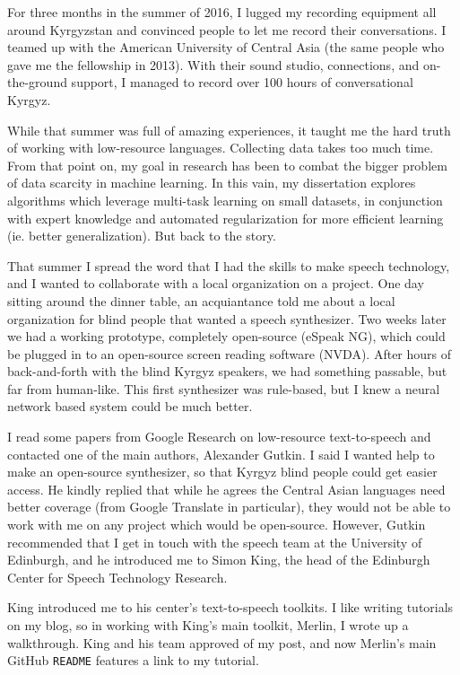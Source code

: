 \documentclass[12pt,a4paper]{article}
\begin{document}
For three months in the summer of 2016, I lugged my recording equipment all around Kyrgyzstan and convinced people to let me record their conversations. I teamed up with the American University of Central Asia (the same people who gave me the fellowship in 2013). With their sound studio, connections, and on-the-ground support, I managed to record over 100 hours of conversational Kyrgyz.

While that summer was full of amazing experiences, it taught me the hard truth of working with low-resource languages. Collecting data takes too much time. From that point on, my goal in research has been to combat the bigger problem of data scarcity in machine learning. In this vain, my dissertation explores algorithms which leverage multi-task learning on small datasets, in conjunction with expert knowledge and automated regularization for more efficient learning (ie. better generalization). But back to the story.

That summer I spread the word that I had the skills to make speech technology, and I wanted to collaborate with a local organization on a project. One day sitting around the dinner table, an acquiantance told me about a local organization for blind people that wanted a speech synthesizer. Two weeks later we had a working prototype, completely open-source (eSpeak NG), which could be plugged in to an open-source screen reading software (NVDA). After hours of back-and-forth with the blind Kyrgyz speakers, we had something passable, but far from human-like. This first synthesizer was rule-based, but I knew a neural network based system could be much better.

I read some papers from Google Research on low-resource text-to-speech and contacted one of the main authors, Alexander Gutkin. I said I wanted help to make an open-source synthesizer, so that Kyrgyz blind people could get easier access. He kindly replied that while he agrees the Central Asian languages need better coverage (from Google Translate in particular), they would not be able to work with me on any project which would be open-source. However, Gutkin recommended that I get in touch with the speech team at the University of Edinburgh, and he introduced me to Simon King, the head of the Edinburgh Center for Speech Technology Research.

King introduced me to his center's text-to-speech toolkits. I like writing tutorials on my blog, so in working with King's main toolkit, Merlin, I wrote up a walkthrough. King and his team approved of my post, and now Merlin's main GitHub \texttt{README} features a link to my tutorial.
\end{document}
